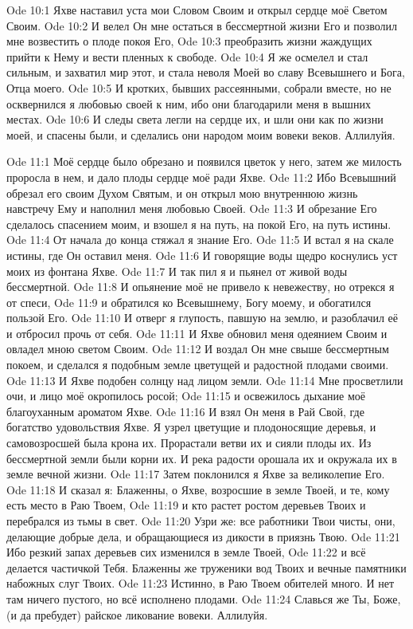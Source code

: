 \vs Ode 10:1
Яхве наставил
уста мои Словом Своим и открыл сердце моё Светом Своим.
\vs Ode 10:2
И велел Он мне
остаться в бессмертной жизни Его и позволил мне возвестить о плоде покоя Его,
\vs Ode 10:3
преобразить
жизни жаждущих прийти к Нему и вести пленных к свободе.
\vs Ode 10:4
Я же осмелел и
стал сильным, и захватил мир этот, и стала неволя Моей во славу Всевышнего и
Бога, Отца моего.
\vs Ode 10:5
И кротких,
бывших рассеянными, собрали вместе, но не осквернился я любовью своей к ним, ибо
они благодарили меня в вышних местах.
\vs Ode 10:6
И следы света
легли на сердце их, и шли они как по жизни моей, и спасены были, и сделались они
народом моим вовеки веков.
Аллилуйя.

\vs Ode 11:1
Моё сердце
было обрезано и появился цветок у него, затем же милость проросла в нем, и дало
плоды сердце моё ради Яхве.
\vs Ode 11:2
Ибо Всевышний
обрезал его своим Духом Святым, и он открыл мою внутреннюю жизнь навстречу Ему и
наполнил меня любовью Своей.
\vs Ode 11:3
И обрезание
Его сделалось спасением моим, и взошел я на путь, на покой Его, на путь истины.
\vs Ode 11:4
От начала до
конца стяжал я знание Его.
\vs Ode 11:5
И встал я на
скале истины, где Он оставил меня.
\vs Ode 11:6
И говорящие
воды щедро коснулись уст моих из фонтана Яхве.
\vs Ode 11:7
И так пил я и
пьянел от живой воды бессмертной.
\vs Ode 11:8
И опьянение
моё не привело к невежеству, но отрекся я от спеси,
\vs Ode 11:9
и обратился ко
Всевышнему, Богу моему, и обогатился пользой Его.
\vs Ode 11:10
И отверг я
глупость, павшую на землю, и разоблачил её и отбросил прочь от себя.
\vs Ode 11:11
И Яхве
обновил меня одеянием Своим и овладел мною светом Своим.
\vs Ode 11:12
И воздал Он
мне свыше бессмертным покоем, и сделался я подобным земле цветущей и радостной
плодами своими.
\vs Ode 11:13
И Яхве
подобен солнцу над лицом земли.
\vs Ode 11:14
Мне
просветлили очи, и лицо моё окропилось росой;
\vs Ode 11:15
и освежилось
дыхание моё благоуханным ароматом Яхве.
\vs Ode 11:16
И взял Он
меня в Рай Свой, где богатство удовольствия Яхве. Я узрел цветущие и
плодоносящие деревья, и самовозросшей была крона их. Прорастали ветви их и сияли
плоды их. Из бессмертной земли были корни их. И река радости орошала их и
окружала их в земле вечной жизни.
\vs Ode 11:17
Затем
поклонился я Яхве за великолепие Его.
\vs Ode 11:18
И сказал я:
Блаженны, о Яхве, возросшие в земле Твоей, и те, кому есть место в Раю Твоем,
\vs Ode 11:19
и кто растет
ростом деревьев Твоих и перебрался из тьмы в свет.
\vs Ode 11:20
Узри же: все
работники Твои чисты, они, делающие добрые дела, и обращающиеся из дикости в
приязнь Твою.
\vs Ode 11:21
Ибо резкий
запах деревьев сих изменился в земле Твоей,
\vs Ode 11:22
и всё
делается частичкой Тебя. Блаженны же труженики вод Твоих и вечные памятники
набожных слуг Твоих.
\vs Ode 11:23
Истинно, в
Раю Твоем обителей много. И нет там ничего пустого, но всё исполнено плодами.
\vs Ode 11:24
Славься же
Ты, Боже, (и да пребудет) райское ликование вовеки.
Аллилуйя.

